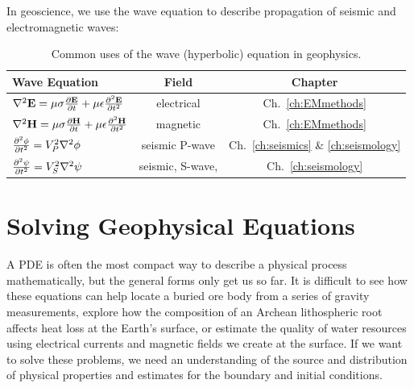 In geoscience, we use the wave equation to describe propagation of seismic
and electromagnetic waves:

\begin{table}[h!]
    \centering
    \caption{Common uses of the wave (hyperbolic) equation in geophysics.}
    \label{tab:waveeq}
    \begin{tabular}{lcc}
        \toprule
        \textbf{Wave Equation} &
        \textbf{Field} &
        \textbf{Chapter} \\
        \midrule
        $\laplacian \vb{E} = \mu \sigma \pdv{\vb{E}}{t} + \mu \epsilon \pdv[2]{\vb{E}}{t}$ & electrical & Ch.~\ref{ch:EMmethods} \\
        $\laplacian \vb{H} = \mu \sigma \pdv{\vb{H}}{t} + \mu \epsilon \pdv[2]{\vb{H}}{t}$ & magnetic & Ch.~\ref{ch:EMmethods} \\
        $\pdv[2]{\phi}{t} = V_P^2 \laplacian \phi$ & seismic P-wave & Ch.~\ref{ch:seismics} \& \ref{ch:seismology} \\
        $\pdv[2]{\vb{\psi}}{t} = V_S^2 \laplacian \vb{\psi}$ & seismic, S-wave, & Ch.~\ref{ch:seismology} \\ 
        \bottomrule
    \end{tabular}
\end{table}

\section{Solving Geophysical Equations}

A PDE is often the most compact way to describe a physical process mathematically, but the general forms only get us so far.  It is difficult to see how these equations can help locate a buried ore body from a series of gravity measurements, explore how the composition of an Archean lithospheric root affects heat loss at the Earth's surface, or estimate the quality of water resources using electrical currents and magnetic fields we create at the surface.  If we want to solve these problems, we need an understanding of the source and distribution of physical properties and estimates for the boundary and initial conditions.

